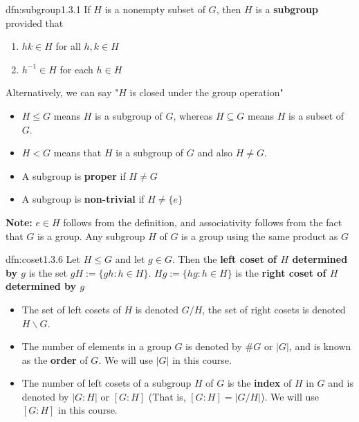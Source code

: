 \documentclass{article}
\begin{document}
\begin{dfn}[Subgroups]{dfn:subgroup}{1.3.1}
    If $H$ is a nonempty subset of $G$, then $H$ is a \textbf{subgroup} provided that
    \begin{enumerate}
        \item $hk \in H$ for all $h, k\in H$
        \item $h^{-1}\in H$ for each $h\in H$
    \end{enumerate}

    Alternatively, we can say "$H$ is closed under the group operation"

    \vspace{-5pt}
    \begin{itemize}
        \item $H \le G$ means $H$ is a subgroup of $G$, whereas $H \subseteq G$ means $H$ is a subset of $G$.
        \item $H < G$ means that $H$ is a subgroup of $G$ and also $H \ne G$.
        \item A subgroup is \textbf{proper} if $H \ne G$
        \item A subgroup is \textbf{non-trivial} if $H \ne \{e\}$
    \end{itemize}
\end{dfn}



\textbf{Note:} $e\in H$ follows from the definition, and associativity follows from the fact that $G$ is a group. Any subgroup $H$ of $G$ is a group using the same product as $G$

\begin{dfn}[Cosets]{dfn:coset}{1.3.6}
    Let $H \le G$ and let $g\in G$. Then the \textbf{left coset of $H$ determined by $g$} is the set $gH := \{gh : h\in H\}$. $Hg := \{hg : h\in H\}$ is the \textbf{right coset of $H$ determined by $g$}

    \begin{itemize}
        \item The set of left cosets of $H$ is denoted $G / H$, the set of right cosets is denoted $H \backslash G$.
        \item The number of elements in a group $G$ is denoted by $\# G$ or $\lvert G \rvert$, and is known as the \textbf{order} of $G$. We will use $\lvert G \rvert$ in this course.
        \item The number of left cosets of a subgroup $H$ of $G$ is the \textbf{index} of $H$ in $G$ and is denoted by $\lvert  G : H \rvert$ or $[ G : H]$ (That is, $[G : H] = \lvert G / H \rvert$). We will use $[G : H]$ in this course.
    \end{itemize}
\end{dfn}
\end{document}
